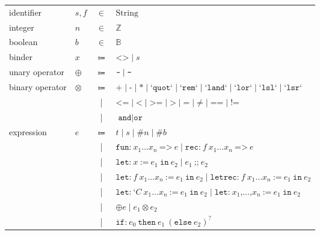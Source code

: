 \begin{figure}[htb]
\centering
\begin{tabular}{llcl}
    identifier &
    $s, f$
    & $\in$ &
    $\mathrm{String}$
  \\
    integer &
    $n$
    & $\in$ &
    $\mathbb{Z}$
  \\
    boolean &
    $b$
    & $\in$ &
    $\mathbb{B}$
  \\
    binder &
    $x$
    & $\Coloneqq$ &
    $\texttt{<>} \mid s$
  \\
    unary operator &
    $\oplus$
    & $\Coloneqq$ &
    $\texttt{\raisebox{0.5ex}{\texttildelow}} \mid \texttt{-}$
  \\
    binary operator &
    $\otimes$
    & $\Coloneqq$ &
    $\texttt{+} \mid \texttt{-} \mid \texttt{*} \mid \texttt{`quot`} \mid \texttt{`rem`} \mid \texttt{`land`} \mid \texttt{`lor`} \mid \texttt{`lsl`} \mid \texttt{`lsr`}$
  \\
    && | &
    $\texttt{<=} \mid \texttt{<} \mid \texttt{>=} \mid \texttt{>} \mid \texttt{=} \mid \texttt{≠} \mid \texttt{==} \mid \texttt{!=}$
  \\
    && | &
    $\texttt{and} \mid \texttt{or}$
  \\
    expression &
    $e$
    & $\Coloneqq$ &
    $t \mid s \mid \texttt{\#} n \mid \texttt{\#} b$
  \\
    && | &
    $\texttt{fun:}\ x_1 \dots x_n\ \texttt{=>}\ e \mid \texttt{rec:}\ f\ x_1 \dots x_n\ \texttt{=>}\ e$
  \\
   && | &
   $\texttt{let:}\ x\ \texttt{:=}\ e_1\ \texttt{in}\ e_2 \mid e_1\ \texttt{;;}\ e_2$
  \\
    && | &
    $\texttt{let:}\ f\ x_1 \dots x_n\ \texttt{:=}\ e_1\ \texttt{in}\ e_2 \mid \texttt{letrec:}\ f\ x_1 \dots x_n\ \texttt{:=}\ e_1\ \texttt{in}\ e_2$
  \\
    && | &
    $\texttt{let:}\ \texttt{‘} C\ x_1 \dots x_n\ \texttt{:=}\ e_1\ \texttt{in}\ e_2 \mid \texttt{let:}\ x_1 \texttt{,} \dots \texttt{,} x_n\ \texttt{:=}\ e_1\ \texttt{in}\ e_2$
  \\
    && | &
    $\oplus e \mid e_1 \otimes e_2$
  \\
    && | &
    $\texttt{if:}\ e_0\ \texttt{then}\ e_1\ (\texttt{else}\ e_2)^?$

\end{tabular}
\end{figure}
